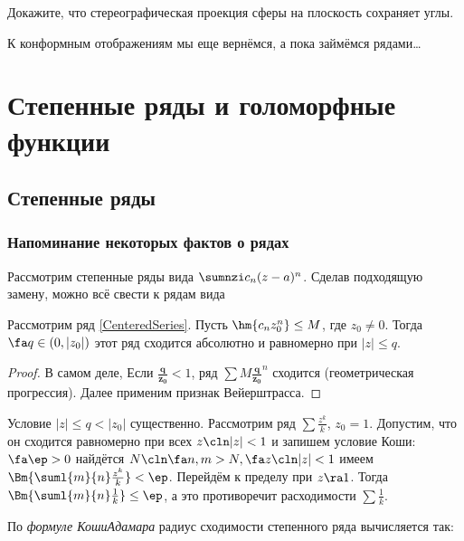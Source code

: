 \documentclass[a4paper]{article}
\begin{document}
\begin{problem}
Докажите, что стереографическая проекция сферы на плоскость сохраняет углы.
\end{problem}

К конформным отображениям мы еще вернёмся, а пока займёмся рядами\ldots

\section{Степенные ряды и голоморфные функции}

\subsection{Степенные ряды}

\subsubsection{Напоминание некоторых фактов о рядах}

Рассмотрим степенные ряды вида $\sumnzi c_n(z-a)^n$.
Сделав подходящую замену, можно  всё свести к рядам вида

\begin{lemma}[Абеля]
Рассмотрим ряд \eqref{CenteredSeries}. Пусть $\hm{c_n z_0^n} \le M$, где $z_0 \neq 0$. Тогда $\fa q \in (0, |z_0|)$ этот
ряд сходится абсолютно и равномерно при $|z| \le q$.
\end{lemma}
\begin{proof}
В самом деле,
Если $\bm{\frac{q}{z_0}} < 1$, ряд $\sum M \bm{\frac{q}{z_0}}^n$ сходится (геометрическая прогрессия).
Далее  применим признак Вейерштрасса.
\end{proof}

\begin{note}
Условие $|z| \le q < |z_0|$ существенно. Рассмотрим ряд $\sum \frac{z^k}{k}$, $z_0=1$.
Допустим, что он сходится равномерно при всех $z\cln |z|<1$ и запишем условие
Коши: $\fa \ep > 0$ найдётся $N\cln \fa n,m>N, \fa z\cln |z| < 1$ имеем
$\Bm{\suml{m}{n} \frac{z^k}{k}} < \ep$. Перейдём к пределу при $z \ra 1$. Тогда
$\Bm{\suml{m}{n} \frac{1}{k}} \le \ep$, а
это противоречит расходимости $\sum \frac{1}{k}$.
\end{note}

По \emph{формуле Коши\ч Адамара} радиус сходимости степенного ряда вычисляется так:
\end{document}
